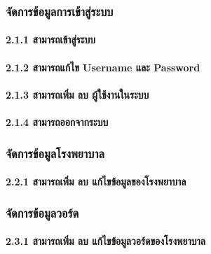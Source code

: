 \hspace{1cm}\subsubsection{จัดการข้อมูลการเข้าสู่ระบบ}

\hspace{2.5cm}\paragraph{2.1.1 สามารถเข้าสู่ระบบ}

\hspace{2.5cm}\paragraph{2.1.2 สามารถแก้ไข Username และ Password}

\hspace{2.5cm}\paragraph{2.1.3 สามารถเพิ่ม ลบ ผู้ใช้งานในระบบ}

\hspace{2.5cm}\paragraph{2.1.4 สามารถออกจากระบบ}

\hspace{1cm}\subsubsection{จัดการข้อมูลโรงพยาบาล}

\hspace{2.5cm}\paragraph{2.2.1 สามารถเพิ่ม ลบ แก้ไขข้อมูลของโรงพยาบาล}

\hspace{1cm}\subsubsection{จัดการข้อมูลวอร์ด}

\hspace{2.5cm}\paragraph{2.3.1 สามารถเพิ่ม ลบ แก้ไขข้อมูลวอร์ดของโรงพยาบาล}

